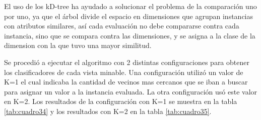 El uso de los kD-tree ha ayudado a solucionar el problema de la comparación uno por uno, ya que el árbol divide el espacio en dimensiones que agrupan instancias con atributos similares, así cada evaluación no debe compararse contra cada instancia, sino que se compara contra las dimensiones, y se asigna a la clase de la dimension con la que tuvo una mayor similitud\cite{key-210}.

Se procedió a ejecutar el algoritmo con 2 distintas configuraciones para obtener los clasificadores de cada vista minable. Una configuración utilizó un valor de K=1 el cual indicaba la cantidad de vecinos mas cercanos que se iban a buscar para asignar un valor a la instancia evaluada. La otra configuración usó este valor en K=2. Los resultados de la configuración con K=1 se muestra en la tabla \ref{tab:cuadro34} y los resultados con K=2 en la tabla \ref{tab:cuadro35}.\\


